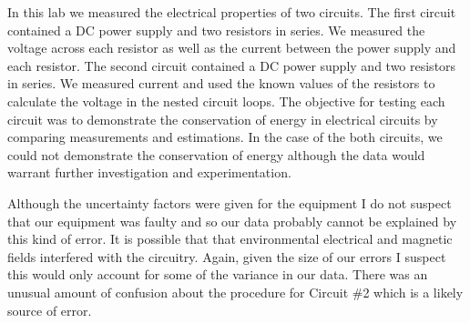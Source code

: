 In this lab we measured the electrical properties of two circuits.  The first circuit contained a DC power supply and two resistors in series.  We measured the voltage across each resistor as well as the current between the power supply and each resistor.  The second circuit contained  a DC power supply and two resistors in series.  We measured current and used the known values of the resistors to calculate the voltage in the nested circuit loops.  The objective for testing each circuit was to demonstrate the conservation of energy in electrical circuits by comparing measurements and estimations.  In the case of the both circuits, we could not demonstrate the conservation of energy although the data would warrant further investigation and experimentation.  

Although the uncertainty factors were given for the equipment I do not suspect that our equipment was faulty and so our data probably cannot be explained by this kind of error.  It is possible that that environmental electrical and magnetic fields interfered with the circuitry.  Again, given the size of our errors I suspect this would only account for some of the variance in our data.  There was an unusual amount of confusion about the procedure for Circuit \#2 which is a likely source of error.